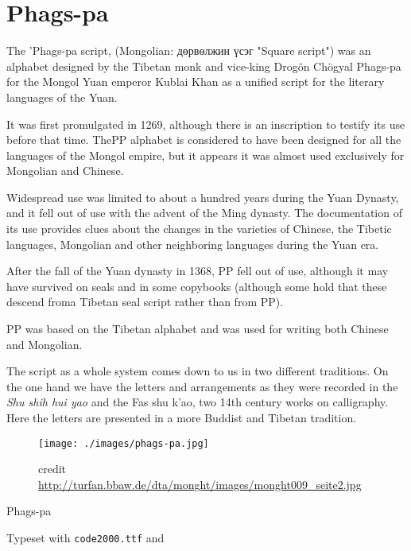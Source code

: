 \chapter{Phags-pa}
\label{s:phagspa}
\newfontfamily{}
\arial 
The 'Phags-pa script, (Mongolian: дөрвөлжин үсэг "Square script") was an alphabet designed by the Tibetan monk and vice-king Drogön Chögyal Phags-pa for the Mongol Yuan emperor Kublai Khan as a unified script for the literary languages of the Yuan. 


It was first promulgated in 1269, although there is an inscription to testify its use before that time. ThePP alphabet is considered to have been designed for all the languages of the Mongol empire, but it appears it was almost used exclusively for Mongolian and Chinese. 

Widespread use was limited to about a hundred years during the Yuan Dynasty, and it fell out of use with the advent of the Ming dynasty. The documentation of its use provides clues about the changes in the varieties of Chinese, the Tibetic languages, Mongolian and other neighboring languages during the Yuan era.

After the fall of the Yuan dynasty in 1368, PP fell out of use, although it may have survived on seals and in some copybooks (although some hold that these descend froma Tibetan seal script rather than from PP).  

PP was based on the Tibetan alphabet and was used for writing both Chinese and Mongolian.

The script as a whole system comes down to us in two different traditions. On the one hand we have the letters and arrangements as they were recorded in the \textit{Shu shih hui yao} and the Fas shu k'ao, two 14th century works on calligraphy. Here the letters are presented in a more Buddist and Tibetan tradition.


\begin{figure}[htbp]
\texttt{[image: ./images/phags-pa.jpg]}

credit \protect\url{http://turfan.bbaw.de/dta/monght/images/monght009_seite2.jpg}
\end{figure}


\begin{scriptexample}[]{Phags-pa}
\bgroup
{}

\arial
\hfill Typeset with \texttt{code2000.ttf} and \cmd{\phagspa}

\egroup
\end{scriptexample}
\medskip

